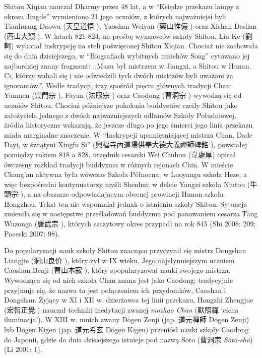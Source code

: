 Shitou Xiqian nauczał Dharmy przez 48 lat, a w ``Księdze przekazu lampy z okresu Jingde'' wymieniono 21 jego uczniów, z których najważniejsi byli Tianhuang Daowu (天皇道悟 ), Yaoshan Weiyan (藥山惟儼 ) oraz Xishan Dadian (西山大顛 ).
W latach 821-824, na prośbę wyznawców szkoły Shitou, Liu Ke (劉軻) wykonał inskrypcję na steli poświęconej Shitou Xiqian.
Chociaż nie zachowała się do dnia dzisiejszego, w ``Biografiach wybitnych mnichów Song'' cytowano jej najbardziej znany fragment: ,,Mazu był mistrzem w Jiangxi, a Shitou w Hunan. Ci, którzy wahali się i nie odwiedzili tych dwóch mistrzów byli uważani za ignorantów.''.
Wedle tradycji, trzy spośród pięciu głównych tradycji Chan: Yunmen (雲門宗 ), Fayan (法眼宗 ) oraz Caodong (曹洞宗 ) wywodzą się od uczniów Shitou.
Chociaż późniejsze pokolenia buddystów czciły Shitou jako założyciela jednego z dwóch najważniejszych odłamów Szkoły Południowej, źródła historyczne wskazują, że jeszcze długo po jego śmierci jego linia przekazu miała marginalne znaczenie.
W ``Inskrypcji upamiętniającej mistrza Chan, Dade Dayi, w świątyni Xingfu Si'' (興福寺內道場供奉大德大義禪師碑銘 ), powstałej pomiędzy rokiem 818 a 828, urzędnik cesarski Wei Chuhou (韋處厚) opisał ówczesny rozkład tradycji buddyzmu w różnych rejonach Chin.
W mieście Chang'an aktywna była wówczas Szkoła Północna; w Luoyangu szkoła Heze, a więc bezpośredni kontynuatorzy myśli Shenhui; w delcie Yangzi szkoła Niutou (牛頭宗 ), a na obszarze odpowiadającym obecnej prowincji Hunan szkoła Hongzhou.
Tekst ten nie wspomniał jednak o istnieniu szkoły Shitou.
Sytuacja zmieniła się w następstwe prześladowań buddyzmu pod panowaniem cesarza Tang Wuzonga (唐武宗 ), których szczytowy okres przypadł na rok 845
(Shi 2008: 209; Poceski 2007: 98).

Do popularyzacji nauk szkoły Shitou znacząco przyczynił się mistrz Dongshan Liangjie (洞山良价 ), który żył w IX wieku.
Jego najsłynniejszym uczniem Caoshan Benji (曹山本寂 ), który spopularyzował nauki swojego mistrza.
Wywodząca się od nich szkoła Chan znana jest jako Caodong; tradycyjnie przyjmuje się, że nazwa ta jest połączeniem ich przydomków, Caoshan i Dongshan.
Żyjący w XI i XII w. dzierżawca tej linii przekazu, Hongzhi Zhengjue (宏智正覺 ) nauczał techniki medytacji zwanej \textit{mozhao Chan} (默照禪  `cicha iluminacja').
W XIII w. mnich zwany Dōgen Zenji (jap. {\ipaexgothic 道元禅師} Dōgen Zenji) lub Dōgen Kigen (jap. {\ipaexgothic 道元希玄} Dōgen Kigen) przeniósł nauki szkoły Caodong do Japonii, gdzie do dnia dzisiejszego istnieje pod nazwą Sōtō ({\ipaexgothic 曹洞宗} \textit{Sōtō-shū})
(Li 2001: 1).

